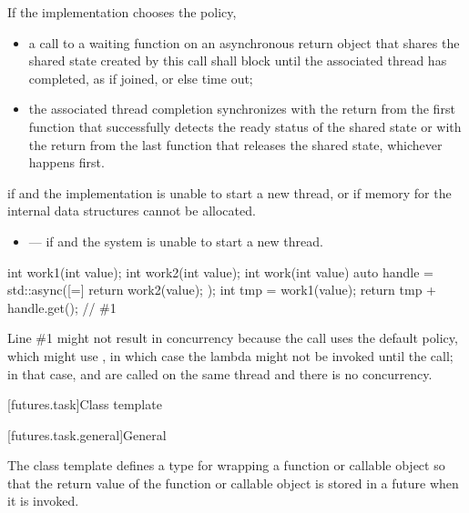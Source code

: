 \begin{itemdescr}
If the implementation chooses the  policy,
\begin{itemize}
\item
a call to a waiting function on an asynchronous return
object that shares the shared state created by this  call shall
block until the associated thread has completed, as if joined, or else time
out;
\item
the associated thread completion
synchronizes with
the return from
the first function
that successfully detects the ready status of the shared state or
with the return from the last
function that releases the shared state, whichever
happens first.
\end{itemize}

\pnum
\throws
{} if  and the
implementation is unable to start a new thread, or
 if memory for the internal data structures
cannot be allocated.

\pnum
\errors
\begin{itemize}
\item {} --- if
 and the system is unable to start a new thread.
\end{itemize}
\end{itemdescr}

\pnum
\begin{example}
\begin{codeblock}
int work1(int value);
int work2(int value);
int work(int value) {
  auto handle = std::async([=]{ return work2(value); });
  int tmp = work1(value);
  return tmp + handle.get();    // \#1
}
\end{codeblock}

\begin{note}
Line \#1 might not result in concurrency because
the  call uses the default policy, which might use
, in which case the lambda might not be invoked until the
 call; in that case,  and  are called on the
same thread and there is no concurrency.
\end{note}
\end{example}

[futures.task]{Class template }

[futures.task.general]{General}

\pnum
The class template  defines a type for wrapping a function or
callable object so that the return value of the function or callable object is stored in
a future when it is invoked.

